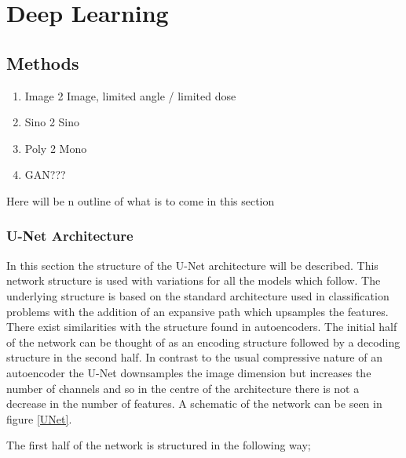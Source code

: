 \chapter{Deep Learning}
\section{Methods}

\begin{enumerate}
\item Image 2 Image, limited angle / limited dose
\item Sino 2 Sino
\item Poly 2 Mono
\item GAN???
\end{enumerate}

Here will be n outline of what is to come in this section

\subsection{U-Net Architecture}

In this section the structure of the U-Net architecture will be described. This network structure is used with variations for all the models which follow. The underlying 
structure is based on the standard architecture used in classification problems with the addition of an expansive path which upsamples the features. There exist similarities 
with the structure found in autoencoders. The initial half of the network can be thought of as an encoding structure followed by a decoding structure in the second half. In contrast
to the usual compressive nature of an autoencoder the U-Net downsamples the image dimension but increases the number of channels and so in the centre of the architecture there is 
not a decrease in the number of features. A schematic of the network can be seen in figure \ref{UNet}. 

The first half of the network is structured in the following way;

